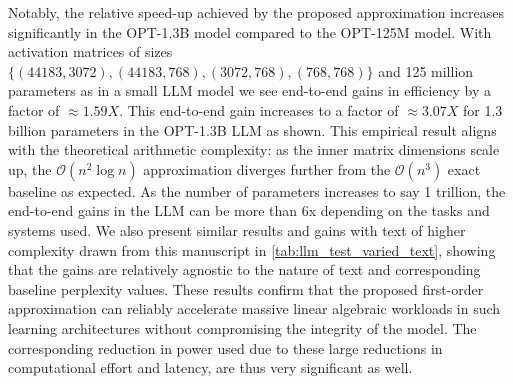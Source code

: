 \documentclass[onefignum,onetabnum]{siamart171218}
\begin{document}
Notably, the relative speed-up achieved by the proposed approximation increases significantly in the OPT-1.3B model compared to the OPT-125M model. With activation matrices of sizes $\{(44183,3072),(44183,768),(3072,768),(768,768)\}$ and 125 million parameters as in a small LLM model we see end-to-end gains in efficiency by a factor of $\approx 1.59X$. This end-to-end gain increases to a factor of $\approx 3.07X$ for 1.3 billion parameters in the OPT-1.3B LLM as shown. This empirical result aligns with the theoretical arithmetic complexity: as the inner matrix dimensions scale up, the $\mathcal{O}(n^2 \log n)$ approximation diverges further from the $\mathcal{O}(n^3)$ exact baseline as expected. As the number of parameters increases to say 1 trillion, the end-to-end gains in the LLM can be more than 6x depending on the tasks and systems used. We also present similar results and gains with text of higher complexity drawn from this manuscript in \cref{tab:llm_test_varied_text}, showing that the gains are relatively agnostic to the nature of text and corresponding baseline perplexity values. These results confirm that the proposed first-order approximation can reliably accelerate massive linear algebraic workloads in such learning architectures without compromising the integrity of the model. The corresponding reduction in power used due to these large reductions in computational effort and latency, are thus very significant as well.
\end{document}
